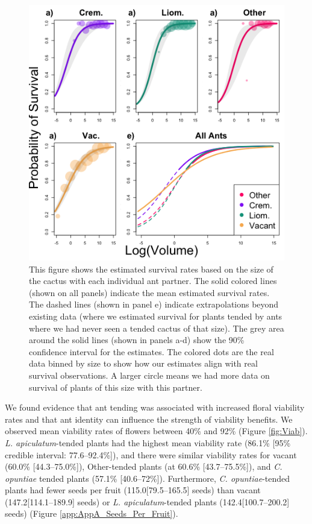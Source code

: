 \documentclass[11pt]{article}
\begin{document}
\begin{figure}[H]
\includegraphics[width=0.95\linewidth]{Figures/survival_plot.png}
\caption{This figure shows the estimated survival rates based on the size of the cactus with each individual ant partner. The solid colored lines (shown on all panels) indicate the mean estimated survival rates. The dashed lines (shown in panel e) indicate extrapolations beyond existing data (where we estimated survival for plants tended by ants where we had never seen a tended cactus of that size). The grey area around the solid lines (shown in panels a-d) show the 90\% confidence interval for the estimates. The colored dots are the real data binned by size to show how our estimates align with real survival observations. A larger circle means we had more data on survival of plants of this size with this partner.}
\label{fig:Surv}
\end{figure}

We found evidence that ant tending was associated with increased floral viability rates and that ant identity can influence the strength of viability benefits.
We observed mean viability rates of flowers between 40\% and 92\% (Figure \ref{fig:Viab}).
\textit{L. apiculatum}-tended plants had the highest mean viability rate (86.1\% [95\% credible interval: 77.6--92.4\%]), and there were similar viability rates for vacant (60.0\% [44.3--75.0\%]), Other-tended plants (at 60.6\% [43.7--75.5\%]), and \textit{C. opuntiae} tended plants (57.1\% [40.6--72\%]). 
Furthermore, \textit{C. opuntiae}-tended plants had fewer seeds per fruit (115.0[79.5--165.5] seeds) than vacant (147.2[114.1--189.9] seeds) or \textit{L. apiculatum}-tended plants (142.4[100.7--200.2] seeds) (Figure \ref{app:AppA_Seeds_Per_Fruit}).
\end{document}
